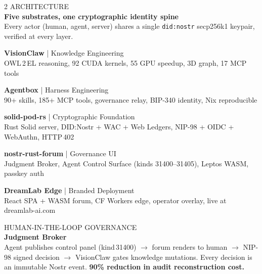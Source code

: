 \documentclass[10pt,a4paper]{article}
\newcommand{\sectiontag}[1]{%
  \vspace{3pt}%
  {\scriptsize\color{gold}\MakeUppercase{#1}}\\[-2pt]%
}
\begin{document}
\begin{multicols}{2}
\sectiontag{Architecture}
{\small\bfseries Five substrates, one cryptographic identity spine}\\[1pt]
{\scriptsize Every actor (human, agent, server) shares a single \texttt{did:nostr} secp256k1 keypair, verified at every layer.}

\vspace{3pt}

{\scriptsize
\textcolor{cyan}{\faProjectDiagram}\;\textbf{\color{cyan}VisionClaw} {\color{textmuted}| Knowledge Engineering}\\[-1pt]
{\color{textmuted}OWL\,2\,EL reasoning, 92 CUDA kernels, 55\texttimes{} GPU speedup, 3D graph, 17 MCP tools}

\vspace{2pt}
\textcolor{purple}{\faCogs}\;\textbf{\color{purple}Agentbox} {\color{textmuted}| Harness Engineering}\\[-1pt]
{\color{textmuted}90+ skills, 185+ MCP tools, governance relay, BIP-340 identity, Nix reproducible}

\vspace{2pt}
\textcolor{emerald}{\faLock}\;\textbf{\color{emerald}solid-pod-rs} {\color{textmuted}| Cryptographic Foundation}\\[-1pt]
{\color{textmuted}Rust Solid server, DID:Nostr + WAC + Web Ledgers, NIP-98 + OIDC + WebAuthn, HTTP\,402}

\vspace{2pt}
\textcolor{gold}{\faBalanceScale}\;\textbf{\color{gold}nostr-rust-forum} {\color{textmuted}| Governance UI}\\[-1pt]
{\color{textmuted}Judgment Broker, Agent Control Surface (kinds 31400--31405), Leptos WASM, passkey auth}

\vspace{2pt}
\textcolor{crimson}{\faGlobe}\;\textbf{\color{crimson}DreamLab Edge} {\color{textmuted}| Branded Deployment}\\[-1pt]
{\color{textmuted}React SPA + WASM forum, CF Workers edge, operator overlay, live at dreamlab-ai.com}
}

\vspace{4pt}

\sectiontag{Human-in-the-Loop Governance}
{\small\bfseries Judgment Broker}\\[1pt]
{\scriptsize Agent publishes control panel (kind\,31400) $\to$ forum renders to human $\to$ NIP-98 signed decision $\to$ VisionClaw gates knowledge mutations. Every decision is an immutable Nostr event. \textbf{90\% reduction in audit reconstruction cost.}}


\end{multicols}
\end{document}
